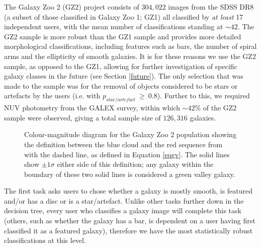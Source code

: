 \documentclass[useAMS,usenatbib]{mn2e}
\begin{document}
The Galaxy Zoo 2 (GZ2) project consists of $304, 022$ images from the SDSS DR8 (a subset of those classified in Galaxy Zoo 1; GZ1) all classified by \emph{at least} 17 independent users, with the mean number of classifications standing at $\sim42$. The GZ2 sample is more robust than the GZ1 sample and provides more detailed morphological classifications, including features such as bars, the number of spiral arms and the ellipticity of smooth galaxies. It is for these reasons we use the GZ2 sample, as opposed to the GZ1, allowing for further investigation of specific galaxy classes in the future (see Section \ref{future}). The only selection that was made to the sample was for the removal of  objects considered to be stars or artefacts by the users (i.e. with $p_{star/artefact} ~\geq~ 0.8$). Further to this, we required NUV photometry from the GALEX survey, within which $\sim42\%$ of the GZ2 sample were observed, giving a total sample size of $126, 316$ galaxies. 

\begin{figure}
\caption{Colour-magnitude diagram for the Galaxy Zoo 2 population showing the definition between the blue cloud and the red sequence from \citet{Baldry04} with the dashed line, as defined in Equation \ref{eqgv}. The solid lines show $\pm 1\sigma$ either side of this definition; any galaxy within the boundary of these two solid lines is considered a green valley galaxy.}
\label{CMGV}
\end{figure}

The first task asks users to chose whether a galaxy is mostly smooth, is featured and/or has a disc or is a star/artefact. Unlike other tasks further down in the decision tree, every user who classifies a galaxy image will complete this task (others, such as whether the galaxy has a bar, is dependent on a user having first classified it as a featured galaxy), therefore we have the most statistically robust classifications at this level.
\end{document}
